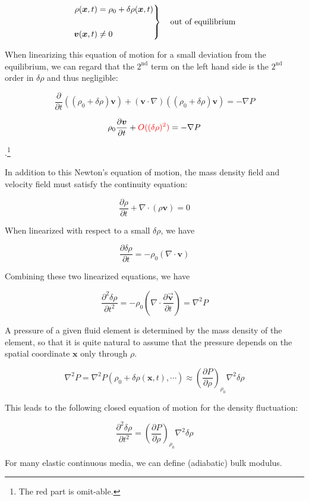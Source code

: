 \[\left.\begin{aligned}
\rho(\bm{x},t) &= \rho_0 + \delta\rho(\bm{x},t)\\
\ & \ \\
\bm{v}(\bm{x},t) &\neq 0
\end{aligned}\right\}\text{\quad out of equilibrium} \]

When linearizing this equation of motion for a small deviation from the equilibrium, we can regard that the $2^{\text{nd}}$ term on the left hand side is the $2^{\text{nd}}$ order in $\delta\rho$ and thus negligible:

\[\frac{\partial}{\partial t}\left((\rho_0+\delta\rho)\bm{v}\right) + (\bm{v}\cdot\nabla)\left((\rho_0+\delta\rho)\bm{v}\right) = -\nabla P \]

\[\rho_0\frac{\partial\bm{v}}{\partial t} + {\color{red}{O((\delta\rho)^2)}}= -\nabla P \]

.\footnote{The red part is omit-able. }

In addition to this Newton's equation of motion, the mass density field and velocity field must satisfy the continuity equation:

\[\frac{\partial \rho}{\partial t}+\nabla\cdot(\rho\bm{v}) = 0 \]

When linearized with respect to a small $\delta \rho$, we have

\[\frac{\partial\delta\rho}{\partial t} = -\rho_0(\nabla\cdot\bm{v}) \]

Combining these two linearized equations, we have

\[\frac{\partial^2\delta\rho}{\partial t^2}= -\rho_0(\nabla\cdot\frac{\partial\vec{\bm{v}}}{\partial t}) = \nabla^2 P \]

A pressure of a given fluid element is determined by the mass density of the element, so that it is quite natural to assume that the pressure depends on the spatial coordinate $\bm{x}$ only through $\rho$.

\[\nabla^2 P = \nabla^2 P(\rho_0+\delta\rho(\bm{x},t),\cdots) \approx\left(\frac{\partial P}{\partial\rho}\right)_{\rho_0}\nabla^2\delta\rho \]

This leads to the following closed equation of motion for the density fluctuation:

\[\frac{\partial^2\delta\rho}{\partial t^2} = \left(\frac{\partial P}{\partial \rho}\right)_{\rho_0}\nabla^2\delta\rho \]

For many elastic continuous media, we can define (adiabatic) bulk modulus.

